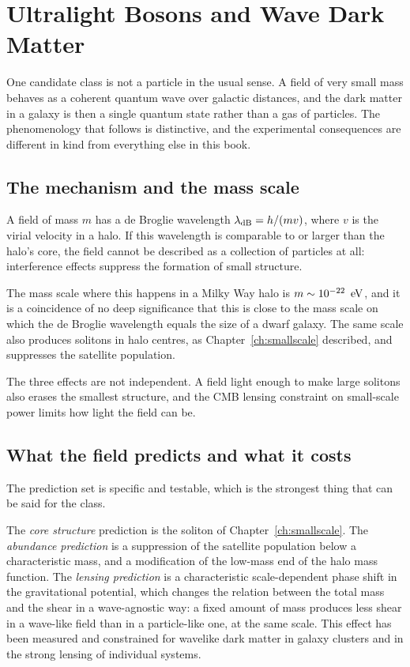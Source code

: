 
\chapter{Ultralight Bosons and Wave Dark Matter}
\label{ch:ultralight}

One candidate class is not a particle in the usual sense. A field of very
small mass behaves as a coherent quantum wave over galactic distances, and
the dark matter in a galaxy is then a single quantum state rather than a
gas of particles. The phenomenology that follows is distinctive, and the
experimental consequences are different in kind from everything else in this
book.

\section{The mechanism and the mass scale}A field of mass $m$ has a de Broglie wavelength
$\lambda_{\rm dB} = h/(mv)$, where $v$ is the virial velocity in a halo. If
this wavelength is comparable to or larger than the halo's core, the field
cannot be described as a collection of particles at all: interference
effects suppress the formation of small structure.

The mass scale where this happens in a Milky Way halo is
$m \sim 10^{-22}\ \,\mathrm{eV}$, and it is a coincidence of no deep significance that
this is close to the mass scale on which the de Broglie wavelength equals
the size of a dwarf galaxy. The same scale also produces solitons in halo
centres, as Chapter~\ref{ch:smallscale} described, and suppresses the
satellite population.

The three effects are not independent. A field light enough to make large
solitons also erases the smallest structure, and the CMB lensing constraint
on small-scale power limits how light the field can be.

\section{What the field predicts and what it costs}The prediction set is specific and testable, which is
the strongest thing that can be said for the class.

The \emph{core structure} prediction is the soliton of Chapter~\ref{ch:smallscale}.
The \emph{abundance prediction} is a suppression of the satellite population
below a characteristic mass, and a modification of the low-mass end of the
halo mass function. The \emph{lensing prediction} is a characteristic
scale-dependent phase shift in the gravitational potential, which changes the
relation between the total mass and the shear in a wave-agnostic way: a
fixed amount of mass produces less shear in a wave-like field than in a
particle-like one, at the same scale. This effect has been measured and
constrained for wavelike dark matter in galaxy clusters and in the strong
lensing of individual systems.

